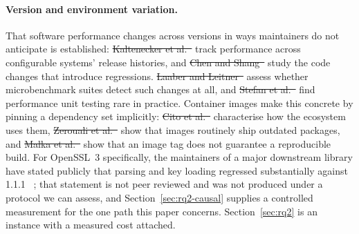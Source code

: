 \documentclass[pdflatex,sn-basic,twocolumn]{sn-jnl}%
\providecommand{\DIFdel}[1]{{\protect\color{red}\sout{#1}}}                      %
\providecommand{\DIFaddbegin}{} %
\providecommand{\DIFaddend}{} %
\providecommand{\DIFdelbegin}{} %
\providecommand{\DIFdelend}{} %
\newcommand{\DIFscaledelfig}{0.5}
\newlength{\DIFdelgraphicswidth} %
\newlength{\DIFdelgraphicsheight} %
\newcommand{\DIFaddincludegraphics}[2][]{{\color{blue}\fbox{\DIFOincludegraphics[#1]{#2}}}} %
\newcommand{\DIFdelincludegraphics}[2][]{%
\sbox{\DIFdelgraphicsbox}{\DIFOincludegraphics[#1]{#2}}%
\settoboxwidth{\DIFdelgraphicswidth}{\DIFdelgraphicsbox} %
\settoboxtotalheight{\DIFdelgraphicsheight}{\DIFdelgraphicsbox} %
\scalebox{\DIFscaledelfig}{%
\parbox[b]{\DIFdelgraphicswidth}{\usebox{\DIFdelgraphicsbox}\\[-\baselineskip] \rule{\DIFdelgraphicswidth}{0em}}\llap{\resizebox{\DIFdelgraphicswidth}{\DIFdelgraphicsheight}{%
\setlength{\unitlength}{\DIFdelgraphicswidth}%
\begin{picture}(1,1)%
\thicklines\linethickness{2pt} %
{\color[rgb]{1,0,0}\put(0,0){\framebox(1,1){}}}%
{\color[rgb]{1,0,0}\put(0,0){\line( 1,1){1}}}%
{\color[rgb]{1,0,0}\put(0,1){\line(1,-1){1}}}%
\end{picture}%
}\hspace*{3pt}}} %
} %
\DeclareRobustCommand{\DIFaddbegin}{\DIFOaddbegin \let\includegraphics\DIFaddincludegraphics} %
\DeclareRobustCommand{\DIFaddend}{\DIFOaddend \let\includegraphics\DIFOincludegraphics} %
\DeclareRobustCommand{\DIFdelbegin}{\DIFOdelbegin \let\includegraphics\DIFdelincludegraphics} %
\DeclareRobustCommand{\DIFdelend}{\DIFOaddend \let\includegraphics\DIFOincludegraphics} %
\begin{document}
\paragraph{Version and environment variation.} That software performance
changes across versions in ways maintainers do not anticipate is established:
\DIFdelbegin \DIFdel{Kaltenecker et al.~}%
\DIFdelend \DIFaddbegin \citet{kaltenecker2023performance} \DIFaddend track performance across
configurable systems' release histories, and \DIFdelbegin \DIFdel{Chen and
Shang~}%
\DIFdelend \DIFaddbegin \citet{chen2017exploratory} \DIFaddend study the code changes that introduce
regressions. \DIFdelbegin \DIFdel{Laaber and Leitner~}%
\DIFdelend \DIFaddbegin \citet{laaber2018evaluation} \DIFaddend assess whether
microbenchmark suites detect such changes at all, and \DIFdelbegin \DIFdel{Stefan et
al.~}%
\DIFdelend \DIFaddbegin \citet{stefan2017unit} \DIFaddend find performance unit testing rare in practice.
Container images make this concrete by pinning a dependency set implicitly:
\DIFdelbegin \DIFdel{Cito et al.~}%
\DIFdelend \DIFaddbegin \citet{cito2017empirical} \DIFaddend characterise how the ecosystem uses them,
\DIFdelbegin \DIFdel{Zerouali et al.~}%
\DIFdelend \DIFaddbegin \citet{zerouali2019outdated} \DIFaddend show that images routinely ship
outdated packages, and \DIFdelbegin \DIFdel{Malka et al.~}%
\DIFdelend \DIFaddbegin \citet{malka2026docker} \DIFaddend show that an image
tag does not guarantee a reproducible build. For OpenSSL~3 specifically, the
maintainers of a major downstream library have stated publicly that parsing and
key loading regressed substantially against 1.1.1~\DIFdelbegin %
\DIFdelend \DIFaddbegin \citep{pyca2026stateofopenssl}\DIFaddend ;
that statement is not peer reviewed and was not produced under a protocol we
can assess, and Section~\ref{sec:rq2-causal} supplies a controlled measurement
for the one path this paper concerns. Section~\ref{sec:rq2} is an instance with
a measured cost attached.
\end{document}
